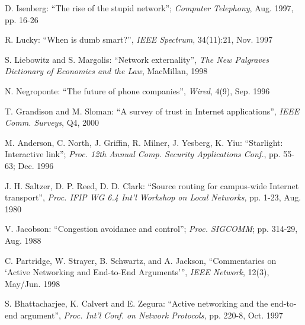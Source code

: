 \documentclass[a4paper,11pt,notitlepage,twoside,openright]{article}
\begin{document}
\begin{enumerate}[label={[}\arabic*{]}]
  D. Isenberg: ``The rise of the stupid network''; \emph{Computer
  Telephony}, Aug. 1997, pp. 16-26
\item
  R. Lucky: ``When is dumb smart?'', \emph{IEEE Spectrum}, 34(11):21,
  Nov. 1997
\item
  S. Liebowitz and S. Margolis: ``Network externality'', \emph{The New
  Palgraves Dictionary of Economics and the Law}, MacMillan, 1998
\item
  N. Negroponte: ``The future of phone companies'', \emph{Wired}, 4(9),
  Sep. 1996
\item
  T. Grandison and M. Sloman: ``A survey of trust in Internet
  applications'', \emph{IEEE Comm. Surveys}, Q4, 2000
\item
  M. Anderson, C. North, J. Griffin, R. Milner, J. Yesberg, K. Yiu:
  ``Starlight: Interactive link''; \emph{Proc. 12th Annual Comp.
  Security Applications Conf.}, pp. 55-63; Dec. 1996
\item
  J. H. Saltzer, D. P. Reed, D. D. Clark: ``Source routing for
  campus-wide Internet transport'', \emph{Proc. IFIP WG 6.4 Int'l
  Workshop on Local Networks}, pp. 1-23, Aug. 1980
\item
  V. Jacobson: ``Congestion avoidance and control''; \emph{Proc.
  SIGCOMM}; pp. 314-29, Aug. 1988
\item
  C. Partridge, W. Strayer, B. Schwartz, and A. Jackson, ``Commentaries
  on `Active Networking and End-to-End Arguments''', \emph{IEEE
  Network}, 12(3), May/Jun. 1998
\item
  S. Bhattacharjee, K. Calvert and E. Zegura: ``Active networking and
  the end-to-end argument'', \emph{Proc. Int'l Conf. on Network
  Protocols,} pp. 220-8, Oct. 1997
\end{enumerate}
\end{document}
